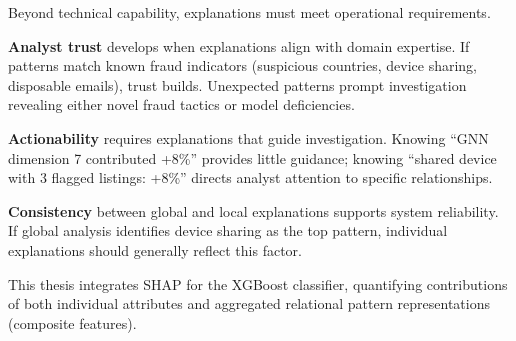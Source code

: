 Beyond technical capability, explanations must meet operational requirements.

\textbf{Analyst trust} develops when explanations align with domain expertise. If patterns match known fraud indicators (suspicious countries, device sharing, disposable emails), trust builds. Unexpected patterns prompt investigation revealing either novel fraud tactics or model deficiencies.

\textbf{Actionability} requires explanations that guide investigation. Knowing ``GNN dimension 7 contributed +8\%'' provides little guidance; knowing ``shared device with 3 flagged listings: +8\%'' directs analyst attention to specific relationships.

\textbf{Consistency} between global and local explanations supports system reliability. If global analysis identifies device sharing as the top pattern, individual explanations should generally reflect this factor.

This thesis integrates SHAP for the XGBoost classifier, quantifying contributions of both individual attributes and aggregated relational pattern representations (composite features).
